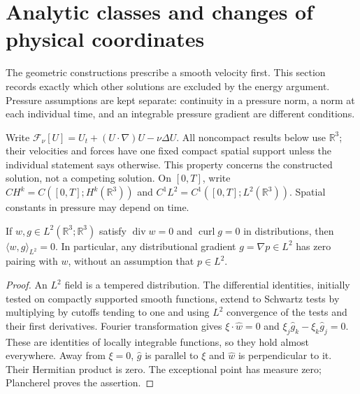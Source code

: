 \section{Analytic classes and changes of physical coordinates}\label{sec:model}
The geometric constructions prescribe a smooth velocity first. This section
records exactly which other solutions are excluded by the energy argument.
Pressure assumptions are kept separate: continuity in a pressure norm, a
norm at each individual time, and an integrable pressure gradient are
different conditions.

Write $\mathcal F_\nu[U]=U_t+(U\cdot\nabla)U-\nu\Delta U$.
All noncompact results below use $\mathbb R^3$; their velocities and forces
have one fixed compact spatial support unless the individual statement
says otherwise. This property concerns the constructed solution, not a
competing solution. On $[0,T]$, write $CH^k=C([0,T];H^k(\mathbb R^3))$
and $C^1L^2=C^1([0,T];L^2(\mathbb R^3))$. Spatial constants in pressure
may depend on time.

\begin{lemma}\label{lem:b-gradient}
If $w,g\in L^2(\mathbb R^3;\mathbb R^3)$ satisfy
$\operatorname{div}w=0$ and $\operatorname{curl}g=0$ in distributions, then
$\langle w,g\rangle_{L^2}=0$. In particular, any distributional gradient
$g=\nabla p\in L^2$ has zero pairing with $w$, without an assumption that
$p\in L^2$.
\end{lemma}
\begin{proof}
An $L^2$ field is a tempered distribution. The differential identities,
initially tested on compactly supported smooth functions, extend to
Schwartz tests by multiplying by cutoffs tending to one and using $L^2$
convergence of the tests and their first derivatives. Fourier transformation
gives $\xi\cdot\widehat w=0$ and
$\xi_j\widehat g_k-\xi_k\widehat g_j=0$. These are identities of locally
integrable functions, so they hold almost everywhere. Away from $\xi=0$,
$\widehat g$ is parallel to $\xi$ and $\widehat w$ is perpendicular to it.
Their Hermitian product is zero. The exceptional point has measure zero;
Plancherel proves the assertion.
\end{proof}

